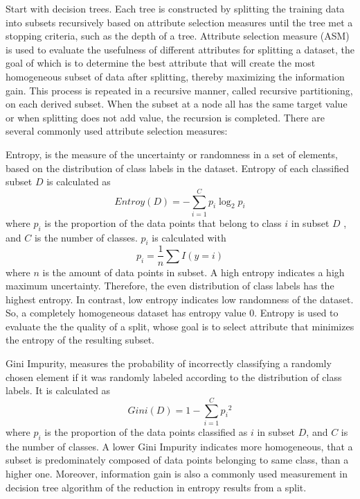 \documentclass[12pt,a4paper,english
]{tunithesis}
\begin{document}
Start with decision trees. Each tree is constructed by splitting the training data into subsets recursively based on attribute selection measures until the tree met a stopping criteria, such as the depth of a tree. Attribute selection measure (ASM) is used to evaluate the usefulness of different attributes for splitting a dataset, the goal of which is to determine the best attribute that will create the most homogeneous subset of data after splitting, thereby maximizing the information gain. This process is repeated in a recursive manner, called recursive partitioning, on each derived subset. When the subset at a node all has the same target value or when splitting does not add value, the recursion is completed. There are several commonly used attribute selection measures:

Entropy, is the measure of the uncertainty or randomness in a set of elements, based on the distribution of class labels in the dataset. Entropy of each classified subset ${D}$ is calculated as
\begin{equation*}
    Entroy(D)=-\sum_{i = 1}^C {p_i} \log _2 {p_i}
\end{equation*}
where ${p_i}$ is the proportion of the data points that belong to class ${i}$ in subset ${D}$ , and ${C}$ is the number of classes. ${p_i}$ is calculated with
\begin{equation*}
    p_i = \frac{1}{n} \sum I(y=i)
\end{equation*}
where ${n}$ is the amount of data points in subset.
A high entropy indicates a high maximum uncertainty. Therefore, the even distribution of class labels has the highest entropy. In contrast, low entropy indicates low randomness of the dataset. So, a completely homogeneous dataset has entropy value 0. Entropy is used to evaluate the the quality of a split, whose goal is to select attribute that minimizes the entropy of the resulting subset.

Gini Impurity, measures the probability of incorrectly classifying a randomly chosen element if it was randomly labeled according to the distribution of class labels. It is calculated as 
\begin{equation*}
    Gini(D) = 1-\sum_{i=1}^C {p_i}^2
\end{equation*}
where ${p_i}$ is the proportion of the data points classified as ${i}$ in subset ${D}$, and ${C}$ is the number of classes. A lower Gini Impurity indicates more homogeneous, that a subset is predominately composed of data points belonging to same class, than a higher one. Moreover, information gain is also a commonly used measurement in decision tree algorithm of the reduction in entropy results from a split.
\end{document}
